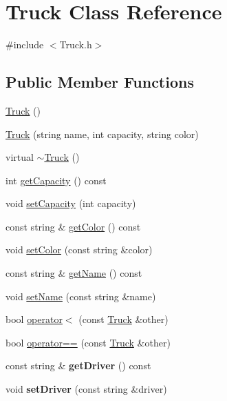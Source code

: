 \hypertarget{class_truck}{}\section{Truck Class Reference}
\label{class_truck}


{\ttfamily \#include $<$Truck.\+h$>$}

\subsection*{Public Member Functions}
\begin{DoxyCompactItemize}
\item 
\hyperlink{class_truck_a87e358bca8fe34e6299c6ff233afb08b}{Truck} ()
\item 
\hyperlink{class_truck_a1eed3bf3df0299bb712fb94f2c04a02f}{Truck} (string name, int capacity, string color)
\item 
virtual \hyperlink{class_truck_afe887186d0490451a8ce4a3ef433dee3}{$\sim$\+Truck} ()
\item 
int \hyperlink{class_truck_abe8f338475f4bc2d3059060ca056b199}{get\+Capacity} () const 
\item 
void \hyperlink{class_truck_ac4491b8f4aac4f0fe4e45126fc29fb5f}{set\+Capacity} (int capacity)
\item 
const string \& \hyperlink{class_truck_a1d034961541fb52b6cfafb6624cd39c4}{get\+Color} () const 
\item 
void \hyperlink{class_truck_a06e57ab2802670274383cab8e4f0d419}{set\+Color} (const string \&color)
\item 
const string \& \hyperlink{class_truck_a248567a755b0cb14eddd027c99dc1ec7}{get\+Name} () const 
\item 
void \hyperlink{class_truck_a9f9fe08c7da567e16360ca2025d90ce0}{set\+Name} (const string \&name)
\item 
bool \hyperlink{class_truck_a327466f9a4068b6c07ae48964dad3e8e}{operator$<$} (const \hyperlink{class_truck}{Truck} \&other)
\item 
bool \hyperlink{class_truck_a3ae0c36f525a7f70b40d879b69eff427}{operator==} (const \hyperlink{class_truck}{Truck} \&other)
\item 
const string \& {\bfseries get\+Driver} () const \hypertarget{class_truck_a09d644bd69771b9884d2e24b10b8f666}{}\label{class_truck_a09d644bd69771b9884d2e24b10b8f666}

\item 
void {\bfseries set\+Driver} (const string \&driver)\hypertarget{class_truck_ae2dc32d864092e5c1083693c1ca3dccc}{}\label{class_truck_ae2dc32d864092e5c1083693c1ca3dccc}

\end{DoxyCompactItemize}


